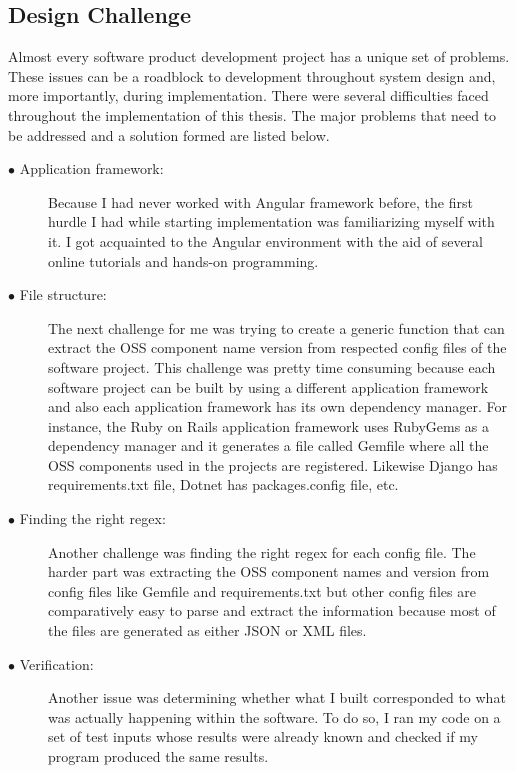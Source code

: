 \subsection{Design Challenge}
Almost every software product development project has a unique set of problems. These issues can be a roadblock to development throughout system design and, more importantly, during implementation. There were several difficulties faced throughout the implementation of this thesis. The major problems that need to be addressed and a solution formed are listed below.
\begin{description}
	\item [$\bullet$ Application framework:] Because I had never worked with Angular framework before, the first hurdle I had while starting implementation was familiarizing myself with it. I got acquainted to the Angular environment with the aid of several online tutorials and hands-on programming.
	
	\item [$\bullet$ File structure:] The next challenge for me was trying to create a generic function that can extract the \acs{OSS} component name version from respected config files of the software project. This challenge was pretty time consuming because each software project can be built by using a different application framework and also each application framework has its own dependency manager. For instance, the Ruby on Rails application framework uses RubyGems as a dependency manager and it generates a file called Gemfile where all the \acs{OSS} components used in the projects are registered. Likewise Django has requirements.txt file, Dotnet has packages.config file, etc.
	
	
	\item [$\bullet$ Finding the right regex:] Another challenge was finding the right regex for each config file. The harder part was extracting the \acs{OSS} component names and version from config files like Gemfile and requirements.txt but other config files are comparatively easy to parse and extract the information because most of the files are generated as either \acs{JSON} or \acs{XML} files.
	
	\item [$\bullet$ Verification:] Another issue was determining whether what I built corresponded to what was actually happening within the software. To do so, I ran my code on a set of test inputs whose results were already known and checked if my program produced the same results.
\end{description}
%
